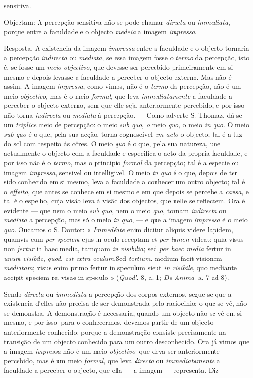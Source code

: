 sensitiva.\par Objectam: A percepção sensitiva não se pode chamar \emph{directa} ou \emph{immediata}, porque entre a faculdade e o objecto \emph{medeia} a imagem \emph{impressa}.\par Resposta. A existencia da imagem \emph{impressa} entre a faculdade e o objecto tornaria a percepção \emph{indirecta} ou \emph{mediata}, se essa imagem fosse o \emph{termo} da percepção, isto é, se fosse um \emph{meio objectivo}, que devesse ser percebido primeiramente em si mesmo e depois levasse a faculdade a perceber o objecto externo. Mas não é assim. A imagem \emph{impressa}, como vimos, não é o \emph{termo} da percepção, não é um meio \emph{objectivo}, mas é o meio \emph{formal}, que leva \emph{immediatamente} a faculdade a perceber o objecto externo, sem que elle seja anteriormente percebido, e por isso não torna \emph{indirecta} ou \emph{mediata} á percepção. --- Como adverte S. Thomaz, dá-se um \emph{triplice} meio de percepção: o meio \emph{sub quo}, \emph{o} meio \emph{quo}, o meio \emph{in quo}. O meio \emph{sub quo} é o que, pela sua acção, torna cognoscivel \emph{em acto} o objecto; tal é a luz do sol com respeito ás côres. O meio \emph{quo} é o que, pela sua natureza, une actualmente o objecto com a faculdade e especifica o acto da propria faculdade, e por isso não é o \emph{termo}, mas o principio \emph{formal} da percepção; tal é a especie ou imagem \emph{impressa}, sensivel ou intelligivel. O meio \emph{tn quo} é o que, depois de ter sido conhecido em si mesmo, leva a faculdade a conhecer um outro objecto; tal é o \emph{effeito}, que antes se conhece em si mesmo e em que depois se percebe a \emph{causa}, e tal é o espelho, cuja visão leva á visão dos objectos, que nelle se reflectem. Ora é evidente --- que nem o meio \emph{sub quo}, nem o meio \emph{quo}, tornam \emph{indirecta} ou \emph{mediata} a percepção, mas só o meio \emph{in quo}, --- e que a imagem \emph{impressa} é o meio \emph{quo}. Oucamos o S. Doutor: « \emph{Immedéate} enim dicitur aliquis videre lapidem, quamvis eum \emph{per speciem} ejus in oculo receptam et \emph{per lumen} videat; quia visus non \emph{fertur} in haec media, tamquam \emph{in visibilia}; sed \emph{per haec media} fertur in \emph{unum visibile}, \emph{quod}. \emph{est extra oculum},Sed \emph{tertium}. medium facit visionem \emph{mediatam}; visus enim primo fertur in speculum sieut \emph{in visibile}, quo mediante accipit speciem rei visae in speculo » (\emph{Quodl}. 8, a. 1; \emph{De Anima}, a. 7 ad 8).\par Sendo \emph{directa} ou \emph{immediata} a percepção dos corpos externos, segue-se que a existencia d'elles não precisa de ser demonstrada pelo raciocinio; o que se vê, não se demonstra. A demonstração é necessaria, quando um objecto não se vê em si mesmo, e por isso, para o conhecermos, devemos partir de um objecto anteriormente conhecido; porque a demonstração consiste precisamente na transição de um objecto conhecido para um outro desconhecido. Ora já vimos que a imagem \emph{impressa} não é um meio \emph{objectivo}, que deva ser anteriormente percebido, mas é um meio \emph{formal}, que leva \emph{directa} ou \emph{immediatamente} a faculdade a perceber o objecto, que ella --- a imagem --- representa. Diz 